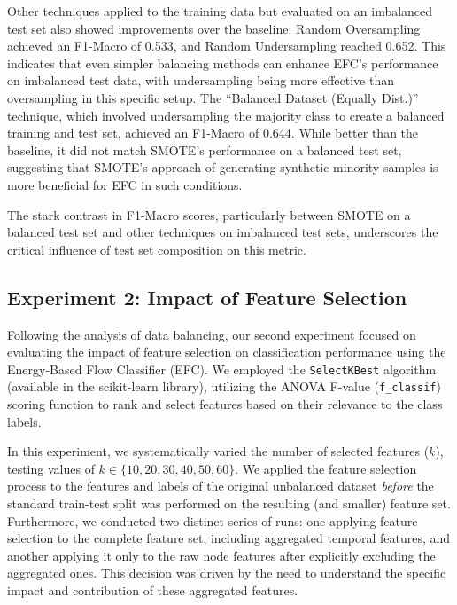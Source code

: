 \documentclass[12pt]{article}
\begin{document}
Other techniques applied to the training data but evaluated on an imbalanced test set
also showed improvements over the baseline: Random Oversampling achieved an F1-Macro of 0.533, and Random Undersampling
reached 0.652. This indicates that even simpler balancing methods can enhance EFC's performance on imbalanced test data,
with undersampling being more effective than oversampling in this specific setup. The ``Balanced Dataset (Equally Dist.)''
technique, which involved undersampling the majority class to create a balanced training and test set, achieved an F1-Macro
of 0.644. While better than the baseline, it did not match SMOTE's performance on a balanced test set, suggesting that
SMOTE's approach of generating synthetic minority samples is more beneficial for EFC in such conditions. 

\begin{highlightbox}
The stark contrast in F1-Macro scores, particularly between SMOTE on a balanced test set and other techniques on imbalanced
test sets, underscores the critical influence of test set composition on this metric.
\end{highlightbox}

\subsection{Experiment 2: Impact of Feature Selection} \label{subsec:experiment_2}

Following the analysis of data balancing, our second experiment focused on evaluating the impact of feature selection on
classification performance using the Energy-Based Flow Classifier (EFC). We employed the \texttt{SelectKBest} algorithm
(available in the scikit-learn library), utilizing the ANOVA F-value (\texttt{f\_classif}) scoring function to rank and
select features based on their relevance to the class labels. 

In this experiment, we systematically varied the number of selected features ($k$), testing values of $k \in \{10, 20, 30,
40, 50, 60\}$. We applied the feature selection process to the features and labels of the original unbalanced dataset
\textit{before} the standard train-test split was performed on the resulting (and smaller) feature set. Furthermore, we conducted
two distinct series of runs: one applying feature selection to the complete feature set, including aggregated temporal
features, and another applying it only to the raw node features after explicitly excluding the aggregated ones. This
decision was driven by the need to understand the specific impact and contribution of these aggregated features. 
\end{document}
